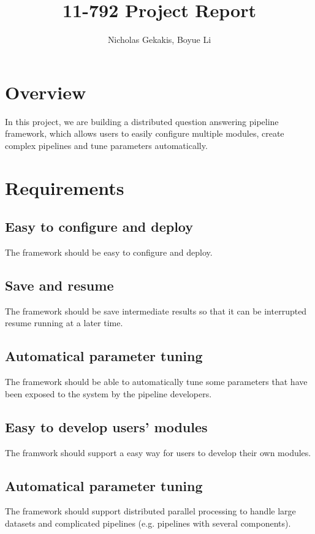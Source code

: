 \documentclass{article}
\begin{document}
\title{11-792 Project Report}
 
\author{Nicholas Gekakis, Boyue Li}
 
\maketitle
 
\section{Overview}

In this project, we are building a distributed question answering pipeline framework,
which allows users to easily configure multiple modules,
create complex pipelines and tune parameters automatically.

\section{Requirements}

    \subsection{Easy to configure and deploy}
    The framework should be easy to configure and deploy.

    \subsection{Save and resume}
    The framework should be save intermediate results so that it can be interrupted resume running at a later time.

    \subsection{Automatical parameter tuning}
    The framework should be able to automatically tune some parameters that have been exposed to the system by the pipeline developers.

    \subsection{Easy to develop users' modules}
    The framwork should support a easy way for users to develop their own modules.

    \subsection{Automatical parameter tuning}
    The framework should support distributed parallel processing to handle large datasets and complicated pipelines (e.g. pipelines with several components).
\end{document}

